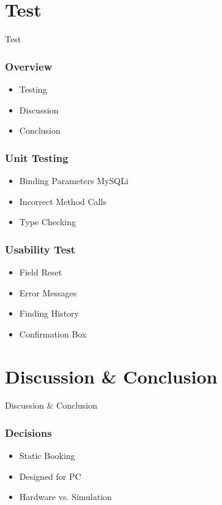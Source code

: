 \section{Test}
\begin{frame}
\begin{center}
\Huge Test
\end{center}
\end{frame}

\begin{frame}
\frametitle{Overview}
\begin{itemize}
	\item Testing
	\item Discussion
	\item Conclusion
\end{itemize}	
\end{frame}

\begin{frame}
\frametitle{Unit Testing}
\begin{itemize}
	\item Binding Parameters MySQLi
	\item Incorrect Method Calls
	\item Type Checking
\end{itemize}
\end{frame}

\begin{frame}
\frametitle{Usability Test}
\begin{itemize}
	\item Field Reset
	\item Error Messages
	\item Finding History
	\item Confirmation Box
\end{itemize}
\end{frame}

\section{Discussion \& Conclusion}
\begin{frame}
\begin{center}
\Huge Discussion \& Conclusion
\end{center}
\end{frame}
\begin{frame}
\frametitle{Decisions}
\begin{itemize}
	\item Static Booking
	\item Designed for PC
	\item Hardware vs. Simulation
\end{itemize}
\end{frame}

